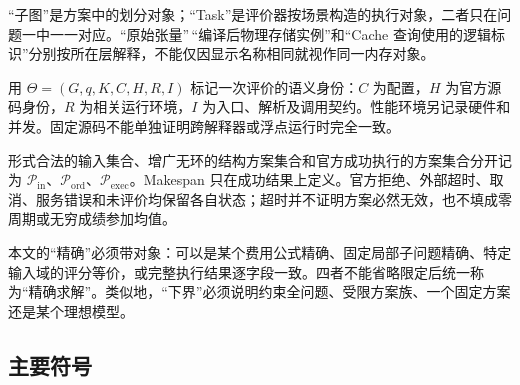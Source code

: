 \documentclass[anonymous,notoc]{gmcm2026}
\begin{document}
``子图''是方案中的划分对象；``Task''是评价器按场景构造的执行对象，二者只在问题一中一一对应。``原始张量''\,``编译后物理存储实例''和``Cache 查询使用的逻辑标识''分别按所在层解释，不能仅因显示名称相同就视作同一内存对象。

用 \(\Theta=(G,q,K,C,H,R,I)\) 标记一次评价的语义身份：\(C\) 为配置，\(H\) 为官方源码身份，\(R\) 为相关运行环境，\(I\) 为入口、解析及调用契约。性能环境另记录硬件和并发。固定源码不能单独证明跨解释器或浮点运行时完全一致。

形式合法的输入集合、增广无环的结构方案集合和官方成功执行的方案集合分开记为 \(\mathcal P_{\mathrm{in}}\)、\(\mathcal P_{\mathrm{ord}}\)、\(\mathcal P_{\mathrm{exec}}\)。Makespan 只在成功结果上定义。官方拒绝、外部超时、取消、服务错误和未评价均保留各自状态；超时并不证明方案必然无效，也不填成零周期或无穷成绩参加均值。

本文的``精确''必须带对象：可以是某个费用公式精确、固定局部子问题精确、特定输入域的评分等价，或完整执行结果逐字段一致。四者不能省略限定后统一称为``精确求解''。类似地，``下界''必须说明约束全问题、受限方案族、一个固定方案还是某个理想模型。

\subsection{主要符号}\label{ux4e3bux8981ux7b26ux53f7}
\end{document}
